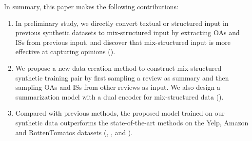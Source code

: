 In summary, this paper makes the following contributions: 
\begin{enumerate}
\item In preliminary study, we directly convert textual or structured input in previous synthetic datasets to mix-structured 
input by extracting OAs and ISs from previous input, and discover that mix-structured input 
is more effective at capturing opinions ().

\item 
We propose a new data creation method to construct mix-structured synthetic training pair 
by first sampling a review as summary and then sampling OAs and ISs from 
other reviews as input. %
We also design a summarization model with a dual encoder for mix-structured data
().

\item 
Compared with previous methods, 
the proposed model trained on our synthetic data outperforms the 
state-of-the-art methods on the Yelp, Amazon and RottenTomatos datasets (, , and ).
\end{enumerate}
